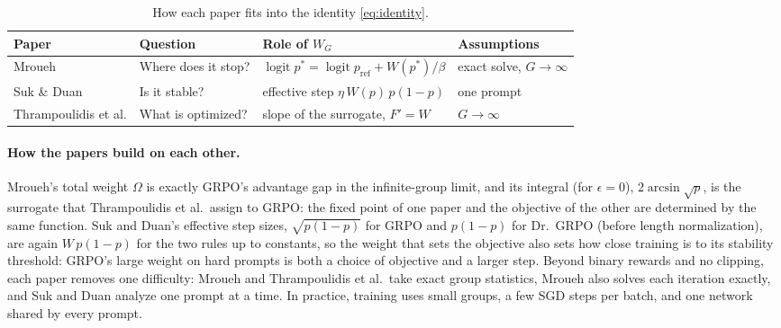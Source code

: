 \documentclass{article}
\theoremstyle{definition}
\newcommand{\1}{\mathbf{1}}
\newcommand{\pref}{p_{\mathrm{ref}}}
\DeclareMathOperator{\logit}{logit}
\begin{document}
\begin{table}[h]
  \centering
  \small
  \caption{How each paper fits into the identity \eqref{eq:identity}.}
  \label{tab:readings}
  \begin{tabular}{@{}llll@{}}
    \toprule
    Paper & Question & Role of $W_G$ & Assumptions \\
    \midrule
    Mroueh & Where does it stop? & $\logit p^\ast=\logit\pref+W(p^\ast)/\beta$ & exact solve, $G\to\infty$ \\
    Suk \& Duan & Is it stable? & effective step $\eta\,W(p)\,p(1-p)$ & one prompt \\
    Thrampoulidis et al. & What is optimized? & slope of the surrogate, $F'=W$ & $G\to\infty$ \\
    \bottomrule
  \end{tabular}
\end{table}

\paragraph{How the papers build on each other.}
Mroueh's total weight $\Omega$ is exactly
GRPO's advantage gap in the infinite-group limit, and its integral
(for $\epsilon=0$), $2\arcsin\sqrt{p}$, is the surrogate that Thrampoulidis et al.\ assign to
GRPO: the fixed point of one paper and the objective of the other are
determined by the same function. Suk and Duan's effective step sizes,
$\sqrt{p(1-p)}$ for GRPO and $p(1-p)$ for Dr.\ GRPO (before length
normalization), are again
$W\,p(1-p)$ for the two rules up to constants, so the weight that sets the objective
also sets how close training is to its stability threshold: GRPO's
large weight on hard prompts is both a choice of objective and a larger
step. Beyond binary rewards and no clipping, each paper removes one
difficulty: Mroueh and Thrampoulidis et al.\ take exact group
statistics, Mroueh also solves each iteration exactly, and Suk and Duan
analyze one prompt at a time. In practice, training uses small groups, a
few SGD steps per batch, and one network shared by every prompt.
\end{document}
